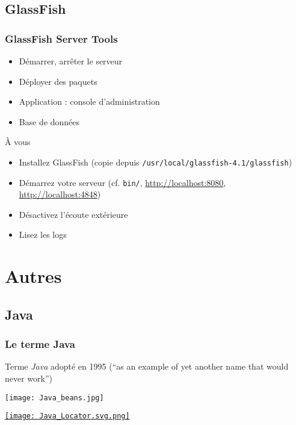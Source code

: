 \documentclass[english, french]{beamer}
\begin{document}
\subsection{GlassFish}
\begin{frame}
	\frametitle{GlassFish Server Tools}
	\begin{itemize}
		\item Démarrer, arrêter le serveur
		\item Déployer des paquets
		\item Application : console d’administration
		\item Base de données
	\end{itemize}
	\begin{block}{À vous}
		\begin{itemize}
			\item \og{}Installez\fg{} GlassFish (copie depuis \texttt{/usr/local/glassfish-4.1/glassfish})
			\item Démarrez votre serveur (cf. \texttt{bin/}, \url{http://localhost:8080}, \url{http://localhost:4848})
			\item Désactivez l’écoute extérieure
			\item Lisez les logs
		\end{itemize}
	\end{block}
\end{frame}

\section{Autres}
\subsection{Java}
\begin{frame}[fragile]
	\frametitle{Le terme Java}
	
	Terme \emph{Java} adopté en 1995 (“as an example of yet another name that would never work”) 
	\hfill
	\vfill
	\begin{minipage}[b]{3cm}
		\texttt{[image: Java\_beans.jpg]}
	\end{minipage}%
	\begin{minipage}[b]{(\columnwidth - 3cm)}
		\pause
		\href{https://en.wikipedia.org/wiki/Java}{\texttt{[image: Java\_Locator.svg.png]}}
	\end{minipage}
\end{frame}
\end{document}
